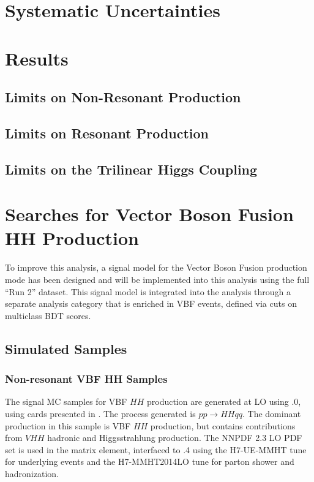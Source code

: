 \section{Systematic Uncertainties}
\section{Results}
\subsection{Limits on Non-Resonant Production}
\subsection{Limits on Resonant Production}
\subsection{Limits on the Trilinear Higgs Coupling}
\section{Searches for Vector Boson Fusion HH Production}

To improve this analysis, a signal model for the Vector Boson Fusion production mode has been designed and will be implemented into this analysis using the full ``Run 2'' dataset. This signal model is integrated into the analysis through a separate analysis category that is enriched in VBF events, defined via cuts on multiclass \gls{BDT} scores.

\subsection{Simulated Samples}

\subsubsection{Non-resonant VBF HH Samples}

The signal MC samples for VBF $HH$ production are generated at LO using .0, using cards presented in \cite{vbfhh}. The process generated is $pp \rightarrow HHqq$. The dominant production in this sample is VBF $HH$ production, but contains contributions from $VHH$  hadronic and Higgsstrahlung production. The NNPDF 2.3 LO PDF set \cite{NNPDF} is used in the matrix element, interfaced to .4 using the H7-UE-MMHT tune for underlying events and the H7-MMHT2014LO tune for parton shower and hadronization.


